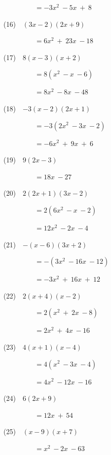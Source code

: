 \documentclass[a4j,twocolumn,10pt,fleqn]{jarticle}
\begin{document}
~~~~~~~~~$=-3x^2~-5x~+~8$

(16)~~$(3x-2)(2x+9)$

~~~~~~~~~$=6x^2~+~23x~-18$

(17)~~$8(x-3)(x+2)$

~~~~~~~~~$=8(x^2~-x~-6)$

~~~~~~~~~$=8x^2~-8x~-48$

(18)~~$-3(x-2)(2x+1)$

~~~~~~~~~$=-3(2x^2~-3x~-2)$

~~~~~~~~~$=-6x^2~+~9x~+~6$

(19)~~$9(2x-3)$

~~~~~~~~~$=18x~-27$

(20)~~$2(2x+1)(3x-2)$

~~~~~~~~~$=2(6x^2~-x~-2)$

~~~~~~~~~$=12x^2~-2x~-4$

(21)~~$-(x-6)(3x+2)$

~~~~~~~~~$=-(3x^2~-16x~-12)$

~~~~~~~~~$=-3x^2~+~16x~+~12$

(22)~~$2(x+4)(x-2)$

~~~~~~~~~$=2(x^2~+~2x~-8)$

~~~~~~~~~$=2x^2~+~4x~-16$

(23)~~$4(x+1)(x-4)$

~~~~~~~~~$=4(x^2~-3x~-4)$

~~~~~~~~~$=4x^2~-12x~-16$

(24)~~$6(2x+9)$

~~~~~~~~~$=12x~+~54$

(25)~~$(x-9)(x+7)$

~~~~~~~~~$=x^2~-2x~-63$
\end{document}
